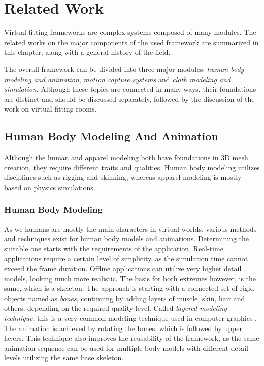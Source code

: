 \chapter{Related Work}
\label{chapter_related_work}

Virtual fitting frameworks are complex systems composed of many modules. The related works on the major components of the used framework are summarized in this chapter, 
along with a general history of the field. 

The overall framework can be divided into three major modules: \textit{human body modeling and animation}, \textit{motion capture systems} and 
\textit{cloth modeling and simulation}. Although these topics are connected in many ways, their foundations are distinct 
and should be discussed separately, followed by the discussion of the work on virtual fitting rooms.

\section{Human Body Modeling And Animation}
\label{section_related_modeling}

Although the human and apparel modeling both have foundations in 3D mesh creation, they require different traits and qualities. Human body modeling utilizes disciplines such as rigging and skinning, whereas apparel modeling is mostly based on physics simulations.

\subsection{Human Body Modeling}
As we humans are mostly the main characters in virtual worlds, various methods and techniques exist for human body models and animations. Determining the suitable one 
starts with the requirements of the application. Real-time applications require a certain level of simplicity, as the simulation time cannot exceed the frame duration. Offline 
applications can utilize very higher detail models, looking much more realistic. The basis for both extremes however, is the same, which is a skeleton. The approach is starting 
with a connected set of rigid objects named as \textit{bones}, continuing by adding layers of muscle, skin, hair and others, depending on the required quality level. Called \textit{layered
modeling technique}, this is a very common modeling technique used in computer graphics \cite{Chadwick1989}. The animation is achieved by rotating the bones, which is followed by 
upper layers. This technique also improves the reusability of the framework, as the same animation sequence can be used for multiple body models with different detail levels utilizing the 
same base skeleton.   

